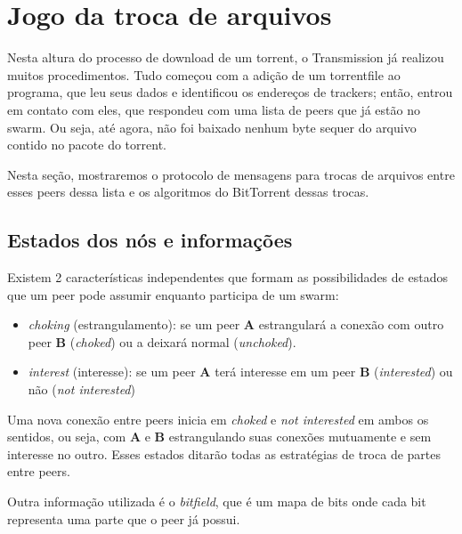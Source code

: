 
\newpage
\section{Jogo da troca de arquivos}
\label{sec:titfortat}

Nesta altura do processo de download de um \gls*{torrent}, o Transmission já realizou
muitos procedimentos. Tudo começou com a adição de um \gls*{torrentfile} ao programa,
que leu seus dados e identificou os endereços de \glspl*{tracker}; então, entrou em
contato com eles, que respondeu com uma lista de \glspl*{peer} que já estão no
\gls*{swarm}. Ou seja, até agora, não foi baixado nenhum byte sequer do arquivo contido
no pacote do \gls*{torrent}.

Nesta seção, mostraremos o protocolo de mensagens para trocas de arquivos entre esses
\glspl*{peer} dessa lista e os algoritmos do BitTorrent dessas trocas.

\subsection*{Estados dos nós e informações}

Existem 2 características independentes que formam as possibilidades de estados que um
\gls*{peer} pode assumir enquanto participa de um \gls*{swarm}:

\begin{itemize}
    \item \emph{choking} (estrangulamento): se um \gls*{peer} \textbf{A} estrangulará a
        conexão com outro \gls*{peer} \textbf{B} (\emph{choked}) ou a deixará normal
        (\emph{unchoked}).

    \item \emph{interest} (interesse): se um \gls*{peer} \textbf{A} terá interesse em
        um \gls*{peer} \textbf{B} (\emph{interested}) ou não (\emph{not interested})
\end{itemize}

Uma nova conexão entre \glspl*{peer} inicia em \emph{choked} e \emph{not interested} em
ambos os sentidos, ou seja, com \textbf{A} e \textbf{B} estrangulando suas conexões
mutuamente e sem interesse no outro. Esses estados ditarão todas as estratégias de troca
de partes entre \glspl*{peer}.

Outra informação utilizada é o \emph{bitfield}, que é um mapa de bits onde cada bit
representa uma parte que o \gls*{peer} já possui.

